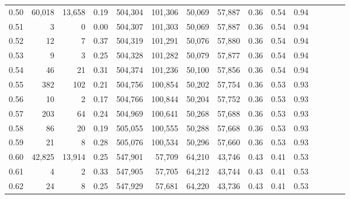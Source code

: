 \begin{tabular}{rrrcrrrrrrrrrrr}
0.50 &  60,018 &  13,658 &                                       0.19 &  504,304 &  101,306 &   50,069 &   57,887 &  0.36 &  0.54 &                         0.94 \\
0.51 &       3 &       0 &                                       0.00 &  504,307 &  101,303 &   50,069 &   57,887 &  0.36 &  0.54 &                         0.94 \\
0.52 &      12 &       7 &                                       0.37 &  504,319 &  101,291 &   50,076 &   57,880 &  0.36 &  0.54 &                         0.94 \\
0.53 &       9 &       3 &                                       0.25 &  504,328 &  101,282 &   50,079 &   57,877 &  0.36 &  0.54 &                         0.94 \\
0.54 &      46 &      21 &                                       0.31 &  504,374 &  101,236 &   50,100 &   57,856 &  0.36 &  0.54 &                         0.94 \\
0.55 &     382 &     102 &                                       0.21 &  504,756 &  100,854 &   50,202 &   57,754 &  0.36 &  0.53 &                         0.93 \\
0.56 &      10 &       2 &                                       0.17 &  504,766 &  100,844 &   50,204 &   57,752 &  0.36 &  0.53 &                         0.93 \\
0.57 &     203 &      64 &                                       0.24 &  504,969 &  100,641 &   50,268 &   57,688 &  0.36 &  0.53 &                         0.93 \\
0.58 &      86 &      20 &                                       0.19 &  505,055 &  100,555 &   50,288 &   57,668 &  0.36 &  0.53 &                         0.93 \\
0.59 &      21 &       8 &                                       0.28 &  505,076 &  100,534 &   50,296 &   57,660 &  0.36 &  0.53 &                         0.93 \\
0.60 &  42,825 &  13,914 &                                       0.25 &  547,901 &   57,709 &   64,210 &   43,746 &  0.43 &  0.41 &                         0.53 \\
0.61 &       4 &       2 &                                       0.33 &  547,905 &   57,705 &   64,212 &   43,744 &  0.43 &  0.41 &                         0.53 \\
0.62 &      24 &       8 &                                       0.25 &  547,929 &   57,681 &   64,220 &   43,736 &  0.43 &  0.41 &                         0.53 \\

\end{tabular}
